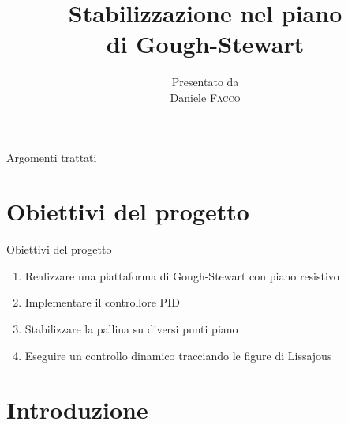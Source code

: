 \documentclass[10pt,aspectratio=169
	]{beamer}
\title[Stabilizzazione nel piano di Gough-Stewart] %
	{\huge Stabilizzazione nel piano\\ di Gough-Stewart} %
\author[Daniele Facco]%
	{%
		{\footnotesize Presentato da}\\
		Daniele \textsc{Facco}%
	}
\institute[
		Dipartimento di ingegneria e architettura\\
		Università degli Studi di Trieste\\
		Italia
	]
	{%
		Università degli Studi di Trieste
	}
\begin{document}
	\maketitle

	\begin{frame}{Argomenti trattati}{}
		\tableofcontents
	\end{frame}


	\section{Obiettivi del progetto}
	\begin{frame}{Obiettivi del progetto}
	\begin{enumerate}[<+->]
		\item Realizzare una piattaforma di Gough-Stewart con piano resistivo
		\item Implementare il controllore PID
		\item Stabilizzare la pallina su diversi punti piano
		\item Eseguire un controllo dinamico tracciando le figure di Lissajous
	\end{enumerate}

	\end{frame}


	\section{Introduzione}
\end{document}
